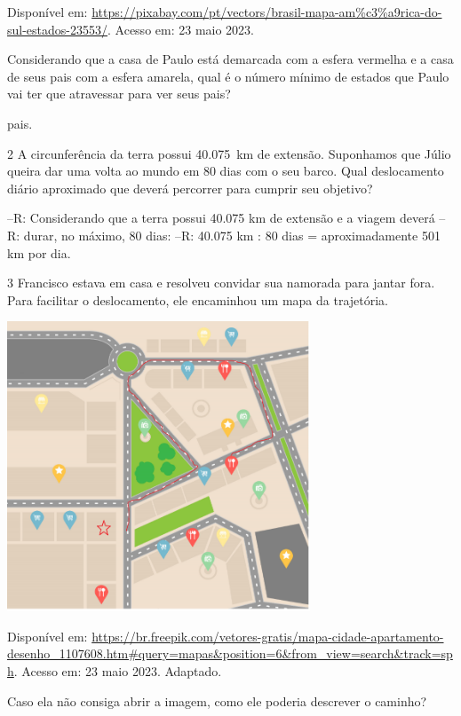{Disponível em:
\url{https://pixabay.com/pt/vectors/brasil-mapa-am\%c3\%a9rica-do-sul-estados-23553/}.
Acesso em: 23 maio 2023.

Considerando que a casa de Paulo está demarcada com a esfera vermelha e
a casa de seus pais com a esfera amarela, qual é o número mínimo de
estados que Paulo vai ter que atravessar para ver seus pais?

pais.

\num{2} A circunferência da terra possui 40.075~km de extensão. Suponhamos
que Júlio queira dar uma volta ao mundo em 80 dias com o seu barco. Qual
deslocamento diário aproximado que deverá percorrer para cumprir seu
objetivo?

--R: Considerando que a terra possui 40.075 km de extensão e a viagem deverá
--R: durar, no máximo, 80 dias:
--R: 40.075 km : 80 dias = aproximadamente 501 km por dia.

\num{3} Francisco estava em casa e resolveu convidar sua namorada para jantar
fora. Para facilitar o deslocamento, ele encaminhou um mapa da
trajetória.

\includegraphics[width=3.55in,height=3.406in]{./imgSAEB_8_MAT/media/image37.png}

Disponível em:
\url{https://br.freepik.com/vetores-gratis/mapa-cidade-apartamento-desenho_1107608.htm\#query=mapas\&position=6\&from_view=search\&track=sph}.
Acesso em: 23 maio 2023. Adaptado.

Caso ela não consiga abrir a imagem, como ele poderia descrever o
caminho?


}
